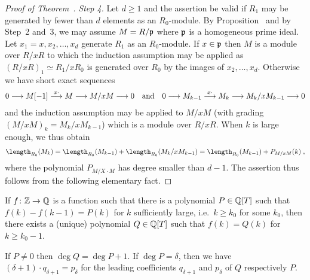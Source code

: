 \documentclass[a4paper,parskip=half,numbers=enddot, DIV=12, headheight=30pt]{scrreprt}
\begin{document}
\begin{proof}[Proof of Theorem~]
    \emph{Step 4.} Let $d\geq 1$ and the assertion be valid if $R_1$ may be generated by fewer than $d$ elements as an $R_0$-module. By Proposition~ and by Step~2 and~3, we may assume $M=R/\mathfrak{p}$ where $\mathfrak{p}$ is a homogeneous prime ideal. Let $x_1=x,x_2,\ldots, x_d$ generate $R_1$ as an $R_0$-module. If $x\in\mathfrak{p}$ then $M$ is a module over $R/x R$ to which the induction assumption may be applied as $(R/xR)_1\simeq R_1/xR_0$ is generated over $R_0$ by the images of $x_2,\ldots, x_d$. Otherwise we have short exact sequences 
    \begin{align*}
        0 \morphism M[-1] \morphism[x\cdot] M \morphism M/xM \morphism 0\quad\text{and}\quad
        0 \morphism M_{k-1}\morphism[x\cdot] M_k \morphism M_k/x M_{k-1} \morphism 0
    \end{align*}
    and the induction assumption may be applied to $M/xM$ (with grading $(M/xM)_k = M_k/xM_{k-1}$) which is a module over $R/xR$. When $k$ is large enough, we thus obtain
    \begin{align*}
    	\length_{R_0}(M_k)=\length_{R_0}(M_{k-1})+\length_{R_0}(M_k/xM_{k-1})=\length_{R_0}(M_{k-1})+P_{M/xM}(k)\;,
    \end{align*}
    where the polynomial $P_{M/X\cdot M}$ has degree smaller than $d-1$. The assertion thus follows from the following elementary fact.
\end{proof}
\begin{fact}
    \begin{alphanumerate}
    \item {}
        If $f\colon \IZ\morphism \IQ$ is a function such that there is a polynomial $P\in\mathbb{Q}[T]$ such that $f(k) -f(k-1) = P(k)$ for $k$ sufficiently large, i.e.\ $k\geq k_0$ for some $k_0$, then there exists a (unique) polynomial $Q\in\mathbb{Q}[T]$ such that $f(k) = Q(k)$ for $k\geq k_0-1$. 
    \item 
        If $P\neq 0$ then $\deg Q = \deg P +1$. If $\deg P = \delta$, then we have $(\delta+1) \cdot q_{\delta+1} = p_\delta$ for the leading coefficients $q_{\delta+1}$ and $p_\delta$ of $Q$ respectively $P$. 
    \end{alphanumerate}
\end{fact}
\end{document}
